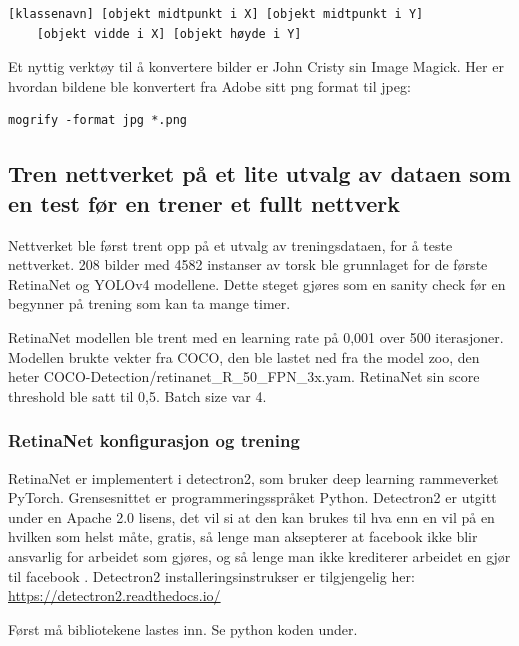 \begin{verbatim}
[klassenavn] [objekt midtpunkt i X] [objekt midtpunkt i Y]
	[objekt vidde i X] [objekt høyde i Y]
\end{verbatim}

Et nyttig verktøy til å konvertere bilder er John Cristy sin Image Magick. Her er hvordan bildene ble konvertert fra Adobe sitt png format til jpeg:

\begin{verbatim}
mogrify -format jpg *.png
\end{verbatim}

\subsection{Tren nettverket på et lite utvalg av dataen som en test før en trener et fullt nettverk}

Nettverket ble først trent opp på et utvalg av treningsdataen, for å teste nettverket. 208 bilder med 4582 instanser av torsk ble grunnlaget for de første RetinaNet og YOLOv4 modellene. Dette steget gjøres som en sanity check før en begynner på trening som kan ta mange timer.

RetinaNet modellen ble trent med en learning rate på 0,001 over 500 iterasjoner. Modellen brukte vekter fra COCO, den ble lastet ned fra the model zoo, den heter COCO-Detection/retinanet\_R\_50\_FPN\_3x.yam. RetinaNet sin score threshold ble satt til 0,5. Batch size var 4.

\subsubsection{RetinaNet konfigurasjon og trening}

RetinaNet er implementert i detectron2, som bruker deep learning rammeverket PyTorch. Grensesnittet er programmeringsspråket Python. Detectron2 er utgitt under en Apache 2.0 lisens, det vil si at den kan brukes til hva enn en vil på en hvilken som helst måte, gratis, så lenge man aksepterer at facebook ikke blir ansvarlig for arbeidet som gjøres, og så lenge man ikke krediterer arbeidet en gjør til facebook \cite{The Apache Software Foundation 2004}. Detectron2 installeringsinstrukser er tilgjengelig her: \url{https://detectron2.readthedocs.io/}

Først må bibliotekene lastes inn. Se python koden under.

